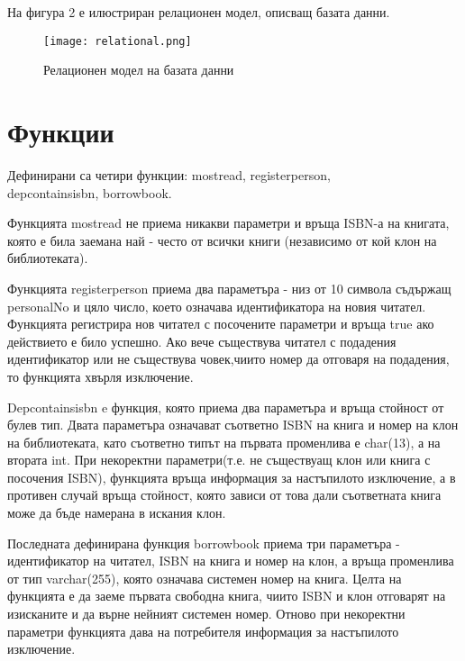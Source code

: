 \documentclass[11pt,a4paper]{article}
\begin{document}
На фигура 2 е илюстриран релационен модел, описващ базата данни.
\pagebreak

\begin{figure}[h!]
\hspace{-70pt}
\texttt{[image: relational.png]}
\caption{Релационен модел на базата данни}
\end{figure}
\pagebreak

\section {Функции}
Дефинирани са четири функции: most\textunderscore read, register\textunderscore person, \\dep\textunderscore contains\textunderscore isbn, borrow\textunderscore book.
\par 
Функцията  most\textunderscore read не приема никакви параметри и връща ISBN-а на книгата, която е била заемана най - често от всички книги (независимо от кой клон на библиотеката). 
\par
Функцията register\textunderscore person приема два параметъра - низ от 10 символа съдържащ personalNo и цяло число, което означава идентификатора на новия читател. Функцията регистрира нов читател с посочените параметри и връща true ако действието е било успешно. Ако вече съществува читател с подадения идентификатор или не съществува човек,чиито номер да отговаря на подадения, то функцията хвърля изключение.
\par
Dep\textunderscore contains\textunderscore isbn e функция, която приема два параметъра и връща стойност от булев тип. Двата параметъра означават съответно ISBN на книга и номер на клон на библиотеката, като съответно типът на първата променлива е char(13), а на втората int. При некоректни параметри(т.е. не съществуащ клон или книга с посочения ISBN), функцията връща информация за настъпилото изключение, а в противен случай връща стойност, която зависи от това дали съответната книга може да бъде намерана в искания клон.
\par
Последната дефинирана функция borrow\textunderscore book приема три параметъра - идентификатор на читател, ISBN на книга и номер на клон, а връща променлива от тип varchar(255), която означава системен номер на книга. Целта на функцията е да заеме първата свободна книга, чиито ISBN и клон отговарят на изисканите и да върне нейният системен номер. Отново при некоректни параметри функцията дава на потребителя информация за настъпилото изключение.
\end{document}
